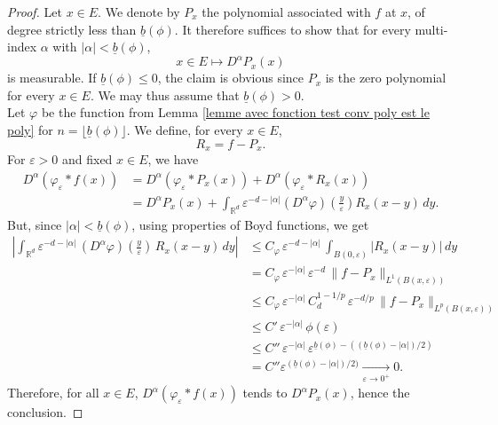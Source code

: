 \documentclass[10pt,a4paper]{amsart}
\begin{document}
\begin{proof}
Let $x \in E$. We denote by $P_x$ the polynomial associated with $f$ at $x$, of degree strictly less than $\underline{b}(\phi)$.
It therefore suffices to show that for every multi-index $\alpha$ with $|\alpha| < \underline{b}(\phi)$,
\[
x \in E \mapsto D^\alpha P_x(x)
\]
is measurable.  
If $\underline{b}(\phi) \leq 0$, the claim is obvious since $P_x$ is the zero polynomial for every $x \in E$. We may thus assume that $\underline{b}(\phi) > 0$.
\smallskip
\\Let $\varphi$ be the function from Lemma \ref{lemme avec fonction test conv poly est le poly} for $n=\lfloor\underline{b}(\phi)\rfloor$. \smallskip
We define, for every $x \in E$,
\[
R_x = f - P_x.
\]
For $\varepsilon > 0$ and fixed $x \in E$, we have
\begin{align*}
D^\alpha \left(\varphi_\varepsilon \ast f(x)\right)
&= D^\alpha \left(\varphi_\varepsilon \ast P_x(x)\right) + D^\alpha \left(\varphi_\varepsilon \ast R_x(x)\right) \\
&= D^\alpha P_x(x) + \int_{\mathbb{R}^d} \varepsilon^{-d - |\alpha|} (D^\alpha \varphi)\left(\frac{y}{\varepsilon}\right) R_x(x - y) \, dy.
\end{align*}
But, since $|\alpha|<\underline{b}(\phi)$, using properties of Boyd functions, we get 
\begin{align*}
\left|\int_{\mathbb{R}^d}\varepsilon^{-d-|\alpha|}\,(D^\alpha \varphi)\left(\frac{y}{\varepsilon}\right)\,R_x(x-y)\,dy\right|
&\leq C_\varphi\,\varepsilon^{-d-|\alpha|}\,\int_{B(0,\varepsilon)}|R_x(x-y)|\,dy\\
&=C_\varphi\,\varepsilon^{-|\alpha|}\,\varepsilon^{-d}\,\|f-P_x\|_{L^1(B(x,\varepsilon))}\\
&\leq C_\varphi\,\varepsilon^{-|\alpha|}\,C_d^{1-1/p} \,\varepsilon^{-d/p}\,\|f-P_x\|_{L^p(B(x,\varepsilon))}\\
&\leq C'\,\varepsilon^{-|\alpha|}\,\phi(\varepsilon)\\
&\leq C''\,\varepsilon^{-|\alpha|}\,\varepsilon^{\underline{b}(\phi)-((\underline{b}(\phi)-|\alpha|)/2)}\\
&= C'' \varepsilon^{(\underline{b}(\phi)-|\alpha|)/2)}\underset{\varepsilon\rightarrow 0^+}{\longrightarrow}0.
\end{align*}
Therefore, for all $x\in E$, $D^\alpha\left(\varphi_\varepsilon \ast f(x)\right)$ tends to $D^\alpha P_x(x)$, hence the conclusion.
\end{proof}
\end{document}
